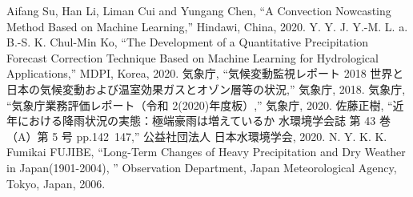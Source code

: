 \begin{thebibliography}{99}
 Aifang Su, Han Li, Liman Cui and Yungang Chen, “A Convection Nowcasting Method Based on Machine Learning,” Hindawi, China, 2020.
 Y. Y. J. Y.-M. L. a. B.-S. K. Chul-Min Ko, “The Development of a Quantitative Precipitation Forecast Correction Technique Based on Machine Learning for Hydrological Applications,” MDPI, Korea, 2020.
 気象庁, “気候変動監視レポート 2018 世界と日本の気候変動および温室効果ガスとオゾン層等の状況,” 気象庁, 2018.
 気象庁, “気象庁業務評価レポート（令和 2(2020)年度板）,” 気象庁, 2020.
 佐藤正樹, “近年における降雨状況の実態：極端豪雨は増えているか 水環境学会誌 第 43 巻（A）第 5 号 pp.142~147,” 公益社団法人 日本水環境学会, 2020.
 N. Y. K. K. Fumikai FUJIBE, “Long-Term Changes of Heavy Precipitation and Dry Weather in Japan(1901-2004), ” Observation Department, Japan Meteorological Agency, Tokyo, Japan, 2006.
\end{thebibliography}